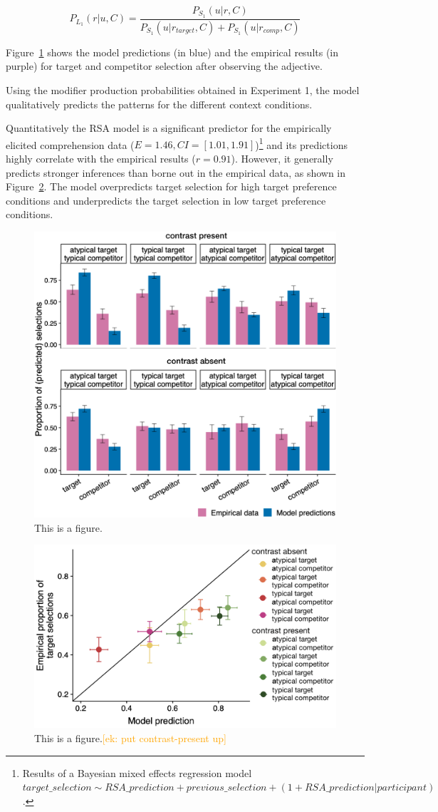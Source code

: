 \documentclass[10pt,letterpaper]{article}
\newcommand{\ek}[1]{\textcolor{Orange}{[ek: #1]}}
\begin{document}
\begin{equation}
	P_{L_1}(r|u,C) = \frac{P_{S_1}(u|r,C)}{P_{S_1}(u|r_{target},C) + P_{S_1}(u|r_{comp},C)}
\label{eq-flatprior}
\end{equation}

Figure~\ref{model-results-flatprior} shows the model predictions (in blue) and the empirical results (in purple) for target and competitor selection after observing the adjective. 

Using the modifier production probabilities obtained in Experiment 1, the model qualitatively predicts the patterns for the different context conditions. 

Quantitatively the RSA model is a significant predictor for the empirically elicited comprehension data ($E=1.46, CI=[1.01, 1.91]$)\footnote{Results of a Bayesian mixed effects regression model $target\_selection \sim RSA\_prediction + previous\_selection + (1+RSA\_prediction|participant)$.} and its predictions highly correlate with the empirical results ($r=0.91$). However, it generally predicts stronger inferences than borne out in the empirical data, as shown in Figure~\ref{model-results-corr-flatprior}. The model overpredicts target selection for high target preference conditions and underpredicts the target selection in low target preference conditions. 

\begin{figure}
	\begin{center}
		\includegraphics[width=.475\textwidth]{graphs/model-bycond-paper.pdf}
	\end{center}
\caption{This is a figure.} 
\label{model-results-flatprior}
\end{figure}

\begin{figure}
	\begin{center}
		\includegraphics[width=.475\textwidth]{graphs/corr-plot.pdf}
	\end{center}
\caption{This is a figure.\ek{put contrast-present up}} 
\label{model-results-corr-flatprior}
\end{figure}
\end{document}
